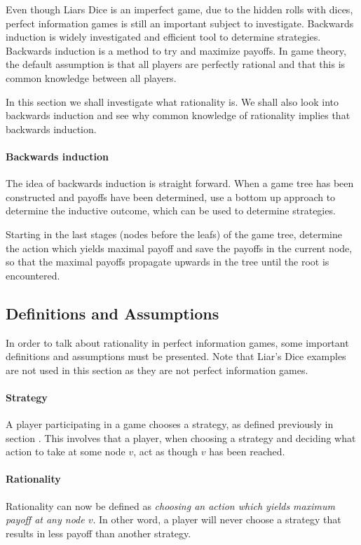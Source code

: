 Even though Liars Dice is an imperfect game, due to the hidden rolls with dices, perfect information games is still an important subject to investigate. 
Backwards induction is widely investigated and efficient tool to determine strategies. Backwards induction is a method to try and maximize payoffs.
In game theory, the default assumption is that all players are perfectly rational and that this is common knowledge between all players.

In this section we shall investigate what rationality is. We shall also look into backwards induction and see why common knowledge of rationality implies that backwards induction.

\paragraph*{Backwards induction}
The idea of backwards induction is straight forward. When a game tree has been constructed and payoffs have been determined, use a bottom up approach to determine the inductive outcome, which can be used to determine strategies. 

Starting in the last stages (nodes before the leafs) of the game tree, determine the action which yields maximal payoff and save the payoffs in the current node, so that the maximal payoffs propagate upwards in the tree until the root is encountered.

\subsection{Definitions and Assumptions}
In order to talk about rationality in perfect information games, some important definitions and assumptions must be presented. Note that Liar's Dice examples are not used in this section as they are not perfect information games.

\paragraph*{Strategy} A player participating in a game chooses a strategy, as defined previously in section . This involves that a player, when choosing a strategy and deciding what action to take at some node $v$, act as though $v$ has been reached.

\paragraph*{Rationality} Rationality can now be defined as \textit{choosing an action which yields maximum payoff at any node $v$}. In other word, a player will never choose a strategy that results in less payoff than another strategy.


